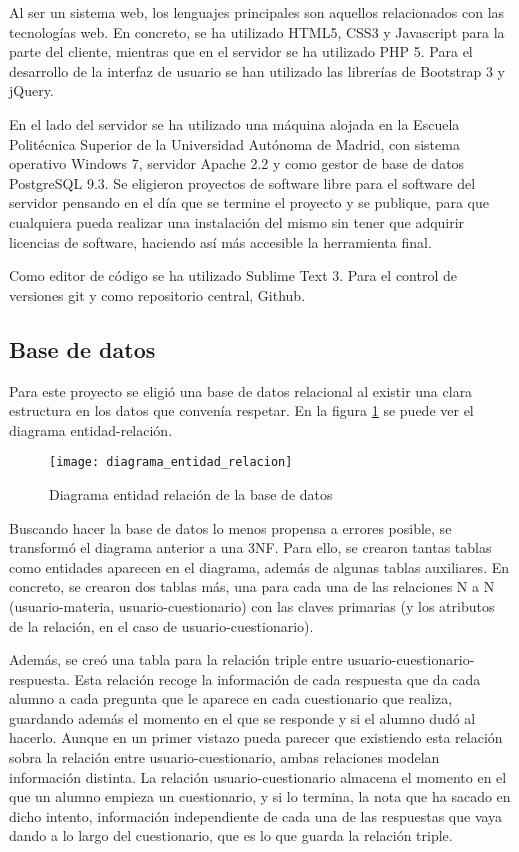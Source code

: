 Al ser un sistema web, los lenguajes principales son aquellos relacionados con las tecnologías web. En concreto, se ha utilizado HTML5, CSS3 y Javascript para la parte del cliente, mientras que en el servidor se ha utilizado PHP 5. Para el desarrollo de la interfaz de usuario se han utilizado las librerías de Bootstrap 3 y jQuery.

En el lado del servidor se ha utilizado una máquina alojada en la Escuela Politécnica Superior de la Universidad Autónoma de Madrid, con sistema operativo Windows 7, servidor Apache 2.2 y como gestor de base de datos PostgreSQL 9.3. Se eligieron proyectos de software libre para el software del servidor pensando en el día que se termine el proyecto y se publique, para que cualquiera pueda realizar una instalación del mismo sin tener que adquirir licencias de software, haciendo así más accesible la herramienta final.

Como editor de código se ha utilizado Sublime Text 3. Para el control de versiones git y como repositorio central, Github.


\subsection{Base de datos}

Para este proyecto se eligió una base de datos relacional al existir una clara estructura en los datos que convenía respetar. En la figura \ref{fig:base de datos} se puede ver el diagrama entidad-relación.

\begin{figure}[htp!]
	\centering
	\texttt{[image: diagrama\_entidad\_relacion]}
	\caption{Diagrama entidad relación de la base de datos}
	\label{fig:base de datos}
\end{figure}

Buscando hacer la base de datos lo menos propensa a errores posible, se transformó el diagrama anterior a una 3NF. Para ello, se crearon tantas tablas como entidades aparecen en el diagrama, además de algunas tablas auxiliares. En concreto, se crearon dos tablas más, una para cada una de las relaciones N a N (usuario-materia, usuario-cuestionario) con las claves primarias (y los atributos de la relación, en el caso de usuario-cuestionario). 

Además, se creó una tabla para la relación triple entre usuario-cuestionario-respuesta. Esta relación recoge la información de cada respuesta que da cada alumno a cada pregunta que le aparece en cada cuestionario que realiza, guardando además el momento en el que se responde y si el alumno dudó al hacerlo. Aunque en un primer vistazo pueda parecer que existiendo esta relación sobra la relación entre usuario-cuestionario, ambas relaciones modelan información distinta. La relación usuario-cuestionario almacena el momento en el que un alumno empieza un cuestionario, y si lo termina, la nota que ha sacado en dicho intento, información independiente de cada una de las respuestas que vaya dando a lo largo del cuestionario, que es lo que guarda la relación triple.


